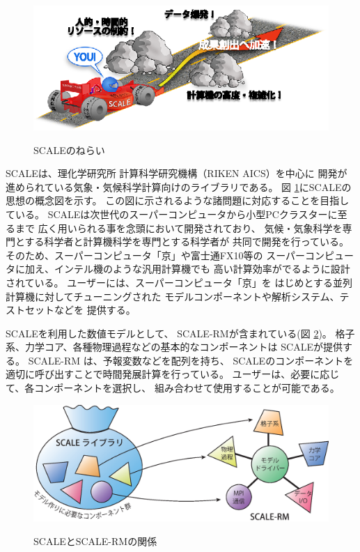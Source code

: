 \begin{figure}[htb]
\begin{center}
  \includegraphics[width=0.9\hsize]{./figure/library.eps}\\
  \caption{SCALEのねらい}
  \label{fig:scale}
\end{center}
\end{figure}

SCALEは、理化学研究所 計算科学研究機構（RIKEN AICS）を中心に
開発が進められている気象・気候科学計算向けのライブラリである。
図 \ref{fig:scale}にSCALEの思想の概念図を示す。
この図に示されるような諸問題に対応することを目指している。
SCALEは次世代のスーパーコンピュータから小型PCクラスターに至るまで
広く用いられる事を念頭において開発されており、
気候・気象科学を専門とする科学者と計算機科学を専門とする科学者が
共同で開発を行っている。
そのため、スーパーコンピュータ「京」や富士通FX10等の
スーパーコンピュータに加え、インテル機のような汎用計算機でも
高い計算効率がでるように設計されている。
ユーザーには、スーパーコンピュータ「京」を
はじめとする並列計算機に対してチューニングされた
モデルコンポーネントや解析システム、テストセットなどを
提供する。


SCALEを利用した数値モデルとして、
SCALE-RMが含まれている(図 \ref{fig:scale-rm})。
格子系、力学コア、各種物理過程などの基本的なコンポーネントは
SCALEが提供する。
SCALE-RM は、予報変数などを配列を持ち、
SCALEのコンポーネントを適切に呼び出すことで時間発展計算を行っている。
ユーザーは、必要に応じて、各コンポーネントを選択し、
組み合わせて使用することが可能である。


\begin{figure}[hbt]
\begin{center}
  \includegraphics[width=0.9\hsize]{./figure/scale.eps}\\
  \caption{SCALEとSCALE-RMの関係}
  \label{fig:scale-rm}
\end{center}
\end{figure}


